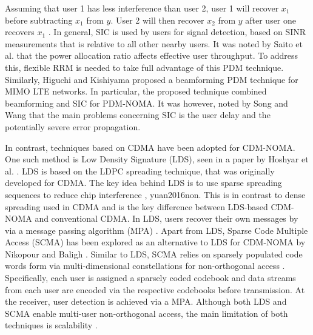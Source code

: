 Assuming that user 1 has less interference than user 2, user 1 will recover $x_1$ before subtracting $x_1$ from $y$. User 2 will then recover $x_2$ from $y$ after user one recovers $x_1$ \cite{saito2013non}. In general, SIC is used by users for signal detection, based on SINR measurements that is relative to all other nearby users. It was noted by Saito et al. \cite{saito2013non} that the power allocation ratio affects effective user throughput. To address this, flexible RRM is needed to take full advantage of this PDM technique. Similarly, Higuchi and Kishiyama \cite{higuchi2013non} proposed a beamforming PDM technique for MIMO LTE networks. In particular, the proposed technique combined beamforming and SIC for PDM-NOMA. It was however, noted by Song and Wang \cite{song2016comparison} that the main problems concerning SIC is the user delay and the potentially severe error propagation.

In contrast, techniques based on CDMA have been adopted for CDM-NOMA. One such method is Low Density Signature (LDS), seen in a paper by Hoshyar et al. \cite{hoshyar2008novel}. LDS is based on the LDPC spreading technique, that was originally developed for CDMA. The key idea behind LDS is to use sparse spreading sequences to reduce chip interference \cite{dai2015non}, {yuan2016non}. This is in contrast to dense spreading used in CDMA and is the key difference between LDS-based CDM-NOMA and conventional CDMA. In LDS, users recover their own messages by via a message passing algorithm (MPA) \cite{dai2015non}. Apart from LDS, Sparse Code Multiple Access (SCMA) has been explored as an alternative to LDS for CDM-NOMA by Nikopour and Baligh \cite{nikopour2013sparse}. Similar to LDS, SCMA relies on sparsely populated code words form via multi-dimensional constellations for non-orthogonal access \cite{yuan2016non}. Specifically, each user is assigned a sparsely coded codebook and data streams from each user are encoded via the respective codebooks before transmission. At the receiver, user detection is achieved via a MPA. Although both LDS and SCMA enable multi-user non-orthogonal access, the main limitation of both techniques is scalability \cite{yuan2016multi}.

